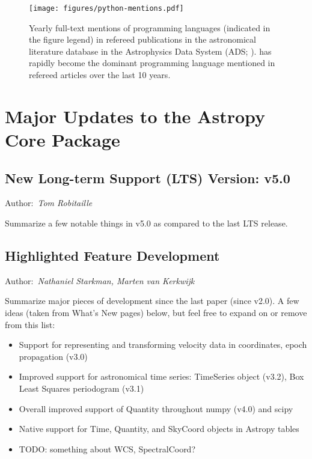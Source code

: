 \documentclass[modern]{aastex631}
\newcommand{\secauthor}[1]{{\color{blue}Author:~\textit{#1}}}
\begin{document}
\begin{figure}
    \begin{centering}
        \texttt{[image: figures/python-mentions.pdf]}
        \caption{
            Yearly full-text mentions of programming languages (indicated in the
            figure legend) in refereed publications in the astronomical
            literature database in the Astrophysics Data System (ADS;
            \citealt{ads}).
            \python has rapidly become the dominant programming language
            mentioned in refereed articles over the last 10 years.
        }
        \label{fig:python-mentions}
    \end{centering}
\end{figure}


\section{Major Updates to the Astropy Core Package} \label{sec:core-updates}

\subsection{New Long-term Support (LTS) Version: v5.0} \label{sec:core-v50}

\secauthor{Tom Robitaille}

Summarize a few notable things in v5.0 as compared to the last LTS release.


\subsection{Highlighted Feature Development} \label{sec:core-features}

\secauthor{Nathaniel Starkman, Marten van Kerkwijk}

Summarize major pieces of development since the last paper (since v2.0). A few
ideas (taken from What's New pages) below, but feel free to expand on or remove
from this list:
\begin{itemize}
    \item Support for representing and transforming velocity data in coordinates, epoch propagation (v3.0)
    \item Improved support for astronomical time series: TimeSeries object (v3.2), Box Least Squares periodogram (v3.1)
    \item Overall improved support of Quantity throughout numpy (v4.0) and scipy
    \item Native support for Time, Quantity, and SkyCoord objects in Astropy tables
    \item TODO: something about WCS, SpectralCoord?
\end{itemize}
\end{document}
